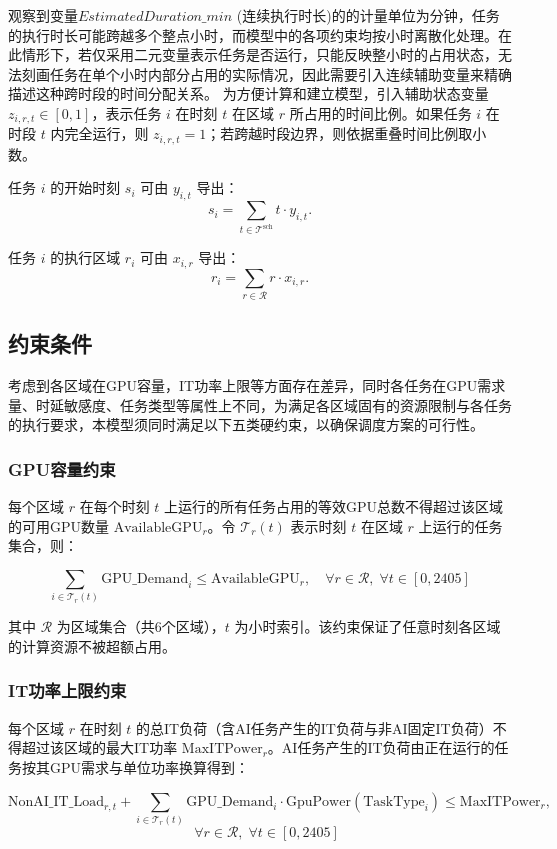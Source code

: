 \documentclass[UTF8,a4paper,zihao=-4]{ctexart}
\begin{document}
观察到变量$EstimatedDuration\_min$ (连续执行时长)的的计量单位为分钟，任务的执行时长可能跨越多个整点小时，而模型中的各项约束均按小时离散化处理。在此情形下，若仅采用二元变量表示任务是否运行，只能反映整小时的占用状态，无法刻画任务在单个小时内部分占用的实际情况，因此需要引入连续辅助变量来精确描述这种跨时段的时间分配关系。
为方便计算和建立模型，引入辅助状态变量 $z_{i, r, t} \in [0, 1]$，表示任务 $i$ 在时刻 $t$ 在区域 $r$ 所占用的时间比例。如果任务 $i$ 在时段 $t$ 内完全运行，则 $z_{i, r, t} = 1$；若跨越时段边界，则依据重叠时间比例取小数。

任务 $i$ 的开始时刻 $s_i$ 可由 $y_{i,t}$ 导出：
\[
s_i = \sum_{t \in \mathcal{T}^{\text{sch}}} t \cdot y_{i,t}.
\]

任务 $i$ 的执行区域 $r_i$ 可由 $x_{i,r}$ 导出：
\[
r_i = \sum_{r \in \mathcal{R}} r \cdot x_{i,r}.
\]
\subsection{约束条件}
考虑到各区域在GPU容量，IT功率上限等方面存在差异，同时各任务在GPU需求量、时延敏感度、任务类型等属性上不同，为满足各区域固有的资源限制与各任务的执行要求，本模型须同时满足以下五类硬约束，以确保调度方案的可行性。

\subsubsection{GPU容量约束}
每个区域 \(r\) 在每个时刻 \(t\) 上运行的所有任务占用的等效GPU总数不得超过该区域的可用GPU数量 \(\mathrm{AvailableGPU}_r\)。令 \(\mathcal{T}_r(t)\) 表示时刻 \(t\) 在区域 \(r\) 上运行的任务集合，则：

\[
\sum_{i \in \mathcal{T}_r(t)} \mathrm{GPU\_Demand}_i \leq \mathrm{AvailableGPU}_r, \quad \forall r \in \mathcal{R},\; \forall t \in [0,2405]
\]

其中 \(\mathcal{R}\) 为区域集合（共6个区域），\(t\) 为小时索引。该约束保证了任意时刻各区域的计算资源不被超额占用。

\subsubsection{IT功率上限约束}
每个区域 \(r\) 在时刻 \(t\) 的总IT负荷（含AI任务产生的IT负荷与非AI固定IT负荷）不得超过该区域的最大IT功率 \(\mathrm{MaxITPower}_r\)。AI任务产生的IT负荷由正在运行的任务按其GPU需求与单位功率换算得到：

\[
\mathrm{NonAI\_IT\_Load}_{r,t} + \sum_{i \in \mathcal{T}_r(t)} \mathrm{GPU\_Demand}_i \cdot \mathrm{GpuPower}(\mathrm{TaskType}_i) \leq \mathrm{MaxITPower}_r,\]
\[
\quad \forall r \in \mathcal{R},\; \forall t \in [0,2405]
\]
\end{document}
